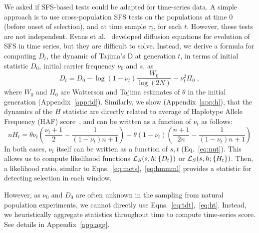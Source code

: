\documentclass[11pt]{article}
\begin{document}
We asked if SFS-based tests could be adapted for time-series data. A
simple approach is to use cross-population SFS tests on the
populations at time $0$ (before onset of selection), and at time
sample $\tau_t$, for each $t$. However, these tests are not
independent. Evans et al.~\cite{evans2007non} developed diffusion
equations for evolution of SFS in time series, but they are difficult
to solve. Instead, we derive a formula for computing $D_t$, the
dynamic of Tajima's D at generation $t$, in terms of initial statistic
$D_0$, initial carrier frequency $\nu_0$ and $s$, as
\begin{equation}
  D_t=D_0-\log(1-\nu_t) \frac{W_0}{\log(2N)} -\nu_t^2 \Pi_0\;,
  \label{eq:tdt}    
\end{equation}
where $W_0$ and $\Pi_0$ are Watterson and Tajima estimates of $\theta$
in the initial generation (Appendix~\ref{app:td}). Similarly, we show
(Appendix~\ref{app:h}), that the dynamics of the $H$ statistic are
directly related to average of Haplotype Allele Frequency (HAF)
score~\cite{ronen2015predicting}, and can be written as a function of
$\nu_t$ as follows:
\begin{equation}
  nH_t= \theta \nu_t \left(\frac{\nu_t+1}{2} -
    \frac{1}{(1-\nu_t)n+1}\right) + \theta
  (1-\nu_t)\left(\frac{n+1}{2n}-\frac{1}{(1-\nu_t)n+1}\right)
  \label{eq:ht}
\end{equation}	
In both cases, $\nu_t$ itself can be written as a function of $s,t$
(Eq.~\ref{eq:nut}). This allows us to compute likelihood functions
${\cal L}_S(s,h; \{D_t\})$ or ${\cal L}_S(s,h; \{H_t\})$. Then, a likelihood
ratio, similar to Eqns.~\ref{eq:mcts},~\ref{eq:hmmml} provides a
statistic for detecting selection in each window.

However, as $\nu_0$ and $D_0$ are often unknown in the sampling from
natural population experiments, we cannot directly use
Eqns.~\ref{eq:tdt},~\ref{eq:ht}. Instead, we heuristically aggregate statistics
throughout time to compute time-series score. See details in
Appendix~\ref{app:agg}.


		
\end{document}
